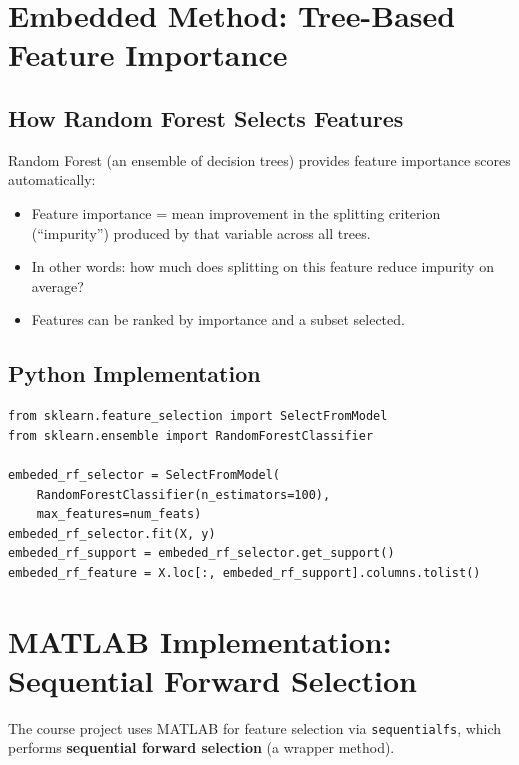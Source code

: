 \documentclass[11pt]{article}
\begin{document}
\newpage
\section{Embedded Method: Tree-Based Feature Importance}

\subsection{How Random Forest Selects Features}
Random Forest (an ensemble of decision trees) provides feature
importance scores automatically:
\begin{itemize}
    \item Feature importance = mean improvement in the splitting
      criterion (``impurity'') produced by that variable across
      all trees.
    \item In other words: how much does splitting on this feature
      reduce impurity on average?
    \item Features can be ranked by importance and a subset selected.
\end{itemize}

\subsection{Python Implementation}
\begin{verbatim}
from sklearn.feature_selection import SelectFromModel
from sklearn.ensemble import RandomForestClassifier

embeded_rf_selector = SelectFromModel(
    RandomForestClassifier(n_estimators=100),
    max_features=num_feats)
embeded_rf_selector.fit(X, y)
embeded_rf_support = embeded_rf_selector.get_support()
embeded_rf_feature = X.loc[:, embeded_rf_support].columns.tolist()
\end{verbatim}


\newpage
\section{MATLAB Implementation: Sequential Forward Selection}

The course project uses MATLAB for feature selection via
\texttt{sequentialfs}, which performs \textbf{sequential forward
selection} (a wrapper method).
\end{document}
